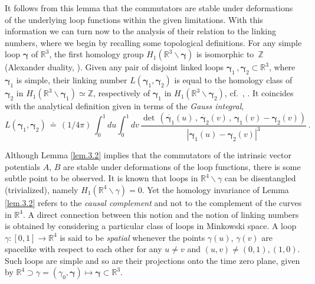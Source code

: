 \documentclass[11pt]{article}
\numberwithin{equation}{section}
\newcommand{\RR}{{\mathbb R}}
\newcommand{\ZZ}{{\mathbb Z}}
\newcommand{\bgamma}{{\bm \gamma}}
\begin{document}
\medskip
It follows from this lemma that the commutators are stable under
deformations of the underlying loop functions within the given 
limitations. With this information we can turn now to the 
analysis of their relation to the linking numbers, 
where we begin by recalling some topological definitions.
For any simple loop $\bgamma$ of $\RR^3$, the first homology group  
$H_1(\RR^3 \backslash \bgamma)$ is isomorphic to~$\ZZ$ 
(Alexander duality, \cite[Chpt.~3]{Hatcher}).
Given any pair of disjoint linked loops 
$\bgamma_1 \, , \bgamma_2 \subset \RR^3$, where $\bgamma_1$ is simple, 
their linking 
number  $L(\bgamma_1, \bgamma_2)$ is equal to  the homology 
class of $\bgamma_2$ in  $H_1(\RR^3 \backslash \bgamma_1) \simeq \ZZ$,
respectively of $\bgamma_1$ in  $H_1(\RR^3 \backslash \bgamma_2)$, 
cf.~\cite[Chpt.~1]{Hatcher}, \cite[Chpt.~5]{Rolfsen}. 
It coincides with the 
analytical definition given in terms of the \emph{Gauss integral},  
%
\begin{equation}
\label{eq.gauss}
L(\bgamma_1, \bgamma_2) \, \doteq \,
(1/4 \pi) \, 
\int_0^1 \! du \! \int_0^1 \! dv \, 
\frac
{ \det \, ( \dot{\bgamma_1}(u) \, , \, \dot{\bgamma_2}(v) 
\, , \, \bgamma_1(v) - \bgamma_2(v) ) }
{ | \bgamma_1(u) - \bgamma_2(v) |^3 } \, .
\end{equation}
%   

\medskip
Although Lemma \ref{lem.3.2} implies that the commutators of the 
intrinsic vector potentials $A$, $B$ are stable under
deformations of the loop functions, there is some 
subtle point to be observed. It is known that
loops in  $\RR^4 \backslash \gamma$ can be disentangled 
(trivialized), namely $H_1(\RR^4 \backslash \gamma) = 0$. 
Yet the homology invariance of 
Lemma \ref{lem.3.2} refers to the \emph{causal
complement} and not to the complement of the curves in $\RR^4$. 
A direct connection between this notion and the 
notion of linking numbers is obtained 
by considering a particular class of loops in Minkowski space.
A loop $\gamma:[0,1]\to\RR^4$ is said to be \emph{spatial} whenever 
the points $\gamma(u)$, $\gamma(v)$ are spacelike with respect
to each other for any $u \ne v$ 
and $(u,v) \ne (0,1),(1,0)$. Such loops are simple and so are 
their projections onto the time zero plane, given by  
$\RR^4 \supset \gamma = (\gamma_0, \bgamma) \mapsto \bgamma \subset \RR^3$. 
\end{document}
